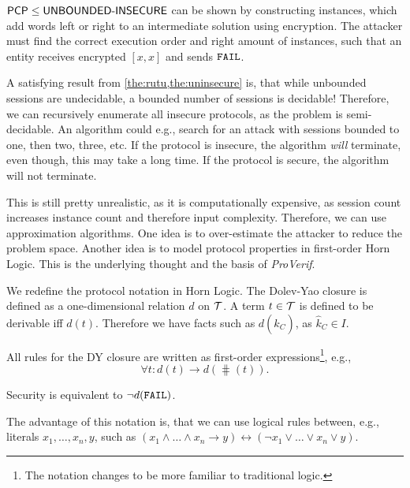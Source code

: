 \(\textsf{PCP} \le \textsf{UNBOUNDED-INSECURE}\) can be shown by constructing instances, which add words left or right to an intermediate solution using encryption.
The attacker must find the correct execution order and right amount of instances, such that an entity receives encrypted \([x, x]\) and sends \(\texttt{FAIL}\).

A satisfying result from \cref{the:rutu,the:uninsecure} is, that while unbounded sessions are undecidable, a bounded number of sessions is decidable!
Therefore, we can recursively enumerate all insecure protocols, as the problem is semi-decidable.
An algorithm could e.g., search for an attack with sessions bounded to one, then two, three, etc.
If the protocol is insecure, the algorithm \emph{will} terminate, even though, this may take a long time.
If the protocol is secure, the algorithm will not terminate.

This is still pretty unrealistic, as it is computationally expensive, as session count increases instance count and therefore input complexity.
Therefore, we can use approximation algorithms.
One idea is to over-estimate the attacker to reduce the problem space.
Another idea is to model protocol properties in first-order Horn Logic.
This is the underlying thought and the basis of \emph{ProVerif}.

\begin{definition}
    We redefine the protocol notation in Horn Logic.
    The Dolev-Yao closure is defined as a one-dimensional relation \(d\) on \(\mathcal{T}\).
    A term \(t \in \mathcal{T}\) is defined to be derivable iff \(d(t)\).
    Therefore we have facts such as \(d(\hat k_C)\), as \(\hat k_C \in I\).

    All rules for the DY closure are written as first-order expressions\footnote{The notation changes to be more familiar to traditional logic.}, e.g.,
    \[\forall t : d(t) \rightarrow d(\hash(t)).\]

    Security is equivalent to \(\neg d(\texttt{FAIL})\).
\end{definition}

The advantage of this notation is, that we can use logical rules between, e.g., literals \(x_1, \dots, x_n, y\), such as \((x_1 \wedge \dots \wedge x_n \rightarrow y) \leftrightarrow (\neg x_1 \vee \dots \vee x_n \vee y)\).

